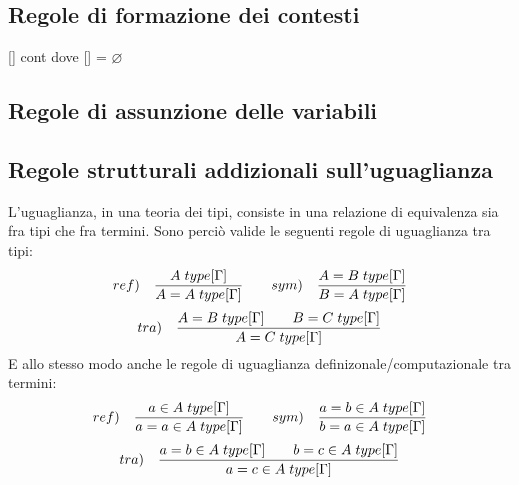 \documentclass[10pt,a4paper, italian]{book}
\begin{document}
\subsection{Regole di formazione dei contesti}
\label{subsec:formazione-contesti}
\begin{center} [\hspace{0.1cm}] cont \quad dove [\hspace{0.1cm}] = $\varnothing$ \end{center}
\begin{prooftree}
\end{prooftree}
\subsection{Regole di assunzione delle variabili}
\label{subsec:assunzione-variabili}
\begin{prooftree}
\end{prooftree}
\subsection{Regole strutturali addizionali sull'uguaglianza}
\label{subsec:uguaglianza}
L'uguaglianza, in una teoria dei tipi, consiste in una relazione di equivalenza sia fra tipi che fra termini. Sono perci\`o valide le seguenti regole di uguaglianza tra tipi:
\[ ref) \quad \frac{A\hspace{0.1cm}type[\Gamma]}{A=A\hspace{0.1cm}type[\Gamma]} \qquad sym) \quad \frac{A=B\hspace{0.1cm}type[\Gamma]}{B=A\hspace{0.1cm}type[\Gamma]} \]
\[ tra) \quad \frac{A=B\hspace{0.1cm}type[\Gamma] \qquad B=C\hspace{0.1cm}type[\Gamma]}{A=C\hspace{0.1cm}type[\Gamma]} \]
E allo stesso modo anche le regole di uguaglianza definizonale/computazionale tra termini:
\[ ref) \quad \frac{a \in A\hspace{0.1cm}type[\Gamma]}{a=a \in A\hspace{0.1cm}type[\Gamma]} \qquad sym) \quad \frac{a=b\in A \hspace{0.1cm}type[\Gamma]}{b=a \in A\hspace{0.1cm}type[\Gamma]} \]
\[ tra) \quad \frac{a=b \in A\hspace{0.1cm}type[\Gamma] \qquad b=c \in A\hspace{0.1cm}type[\Gamma]}{a=c \in A\hspace{0.1cm}type[\Gamma]} \]
\end{document}
